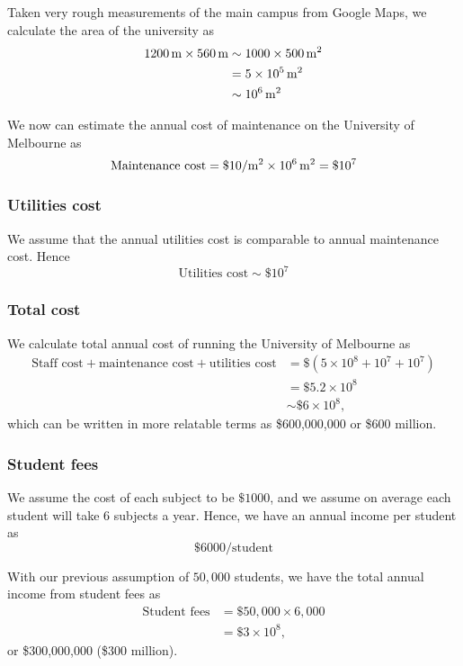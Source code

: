 \documentclass[a4paper]{article} %
\begin{document}
Taken very rough measurements of the main campus from Google Maps, we calculate the area of the university as
\begin{align}
\SI{1200}{m}\times \SI{560}{m}&\sim 1000\times\SI{500}{m^2}\\
&=\SI{5d5}{m^2}\\
&\sim \SI{d6}{m^2}
\end{align}

We now can estimate the annual cost of maintenance on the University of Melbourne as
\begin{equation}
\text{Maintenance cost}=\$10/\text{m}^2\times \SI{d6}{m^2}=\$10^7
\end{equation}

\subsubsection{Utilities cost}
We assume that the annual utilities cost is comparable to annual maintenance cost. Hence 
\begin{equation}
\text{Utilities cost}\sim \$10^7
\end{equation}

\subsubsection{Total cost}
We calculate total annual cost of running the University of Melbourne as
\begin{align}
\text{Staff cost}+\text{maintenance cost}+\text{utilities cost}&=\$(5\times 10^8+10^7+10^7)\\
&=\$5.2\times 10^8\\
&\sim \$6\times 10^8,\label{total cost}
\end{align}
which can be written in more relatable terms as \$600,000,000 or \$600 million.

\subsubsection{Student fees}
We assume the cost of each subject to be $\$1000$, and we assume on average each student will take 6 subjects a year. Hence, we have an annual income per student as
\begin{equation}
\$6000/\text{student}
\end{equation}

With our previous assumption of $50,000$ students, we have the total annual income from student fees as
\begin{align}
\text{Student fees}&=\$50,000\times 6,000\\
&=\$3\times 10^8,\label{total fees}
\end{align}
or \$300,000,000 (\$300 million).
\end{document}
